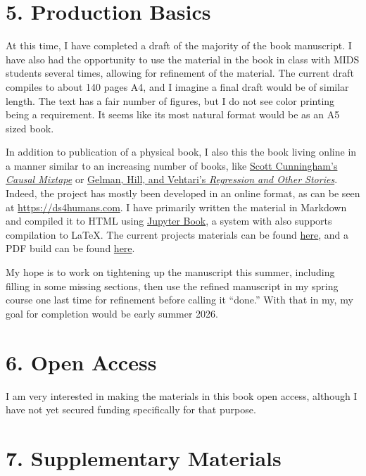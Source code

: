 \documentclass[12pt]{article}
\begin{document}
\section*{5. Production Basics}\label{production-basics}

At this time, I have completed a draft of the majority of the book
manuscript. I have also had the opportunity to use the material in the
book in class with MIDS students several times, allowing for refinement
of the material. The current draft compiles to about 140 pages A4, and I
imagine a final draft would be of similar length. The text has a fair
number of figures, but I do not see color printing being a requirement.
It seems like its most natural format would be as an A5 sized book.

In addition to publication of a physical book, I also this the book
living online in a manner similar to an increasing number of books, like
\href{https://mixtape.scunning.com/}{Scott Cunningham's \emph{Causal
Mixtape}} or \href{https://avehtari.github.io/ROS-Examples/}{Gelman,
Hill, and Vehtari's \emph{Regression and Other Stories}}. Indeed, the
project has mostly been developed in an online format, as can be seen at
\url{https://ds4humans.com}. I have primarily written the material in
Markdown and compiled it to HTML using
\href{https://jupyterbook.org/en/stable/intro.html}{Jupyter Book}, a
system with also supports compilation to LaTeX. The current projects
materials can be found
\href{https://github.com/nickeubank/ds4humans}{here}, and a PDF build
can be found
\href{https://github.com/nickeubank/ds4humans/blob/main/_build/latex/ds4humans.pdf}{here}.

My hope is to work on tightening up the manuscript this summer,
including filling in some missing sections, then use the refined
manuscript in my spring course one last time for refinement before
calling it ``done.'' With that in my, my goal for completion would be
early summer 2026.

\section*{6. Open Access}\label{open-access}

I am very interested in making the materials in this book open access,
although I have not yet secured funding specifically for that purpose.

\section*{7. Supplementary Materials}\label{supplementary-materials}
\end{document}
